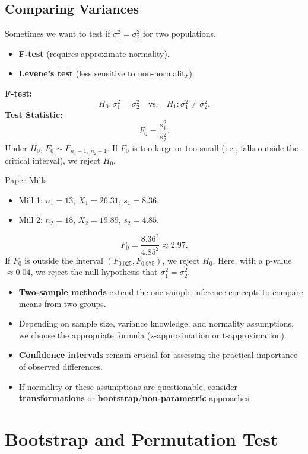 \documentclass[10pt]{extarticle}
\begin{document}
\subsection{Comparing Variances}
Sometimes we want to test if $\sigma_1^2 = \sigma_2^2$ for two populations.
\begin{itemize}
    \item \textbf{F-test} (requires approximate normality).
    \item \textbf{Levene's test} (less sensitive to non-normality).
\end{itemize}
\textbf{F-test:}
$$
    H_0: \sigma_1^2 = \sigma_2^2 \quad \text{vs.} \quad H_1: \sigma_1^2 \neq \sigma_2^2.
$$
\textbf{Test Statistic:}
$$
    F_0 = \frac{s_1^2}{s_2^2}.
$$
Under $H_0$, $F_0 \sim F_{n_1-1,\;n_2-1}$. If $F_0$ is too large or too small (i.e., falls outside the critical interval), we reject $H_0$.
\begin{examplebox}{Paper Mills}{}
    \begin{itemize}
        \item Mill 1: $n_1=13$, $\bar{X}_1=26.31$, $s_1=8.36$.
        \item Mill 2: $n_2=18$, $\bar{X}_2=19.89$, $s_2=4.85$.
    \end{itemize}
    $$
        F_0 = \frac{8.36^2}{4.85^2} \approx 2.97.
    $$
    If $F_0$ is outside the interval $(F_{0.025}, F_{0.975})$, we reject $H_0$. Here, with a p-value $\approx 0.04$, we reject the null hypothesis that $\sigma_1^2=\sigma_2^2$.
\end{examplebox}
\begin{takeaway-box}{}{}
\begin{itemize}
    \item \textbf{Two-sample methods} extend the one-sample inference concepts to compare means from two groups.
    \item Depending on sample size, variance knowledge, and normality assumptions, we choose the appropriate formula (z-approximation or t-approximation).
    \item \textbf{Confidence intervals} remain crucial for assessing the practical importance of observed differences.
    \item If normality or these assumptions are questionable, consider \textbf{transformations} or \textbf{bootstrap}/\textbf{non-parametric} approaches.
\end{itemize}
\end{takeaway-box}

\section{Bootstrap and Permutation Test}
\end{document}
